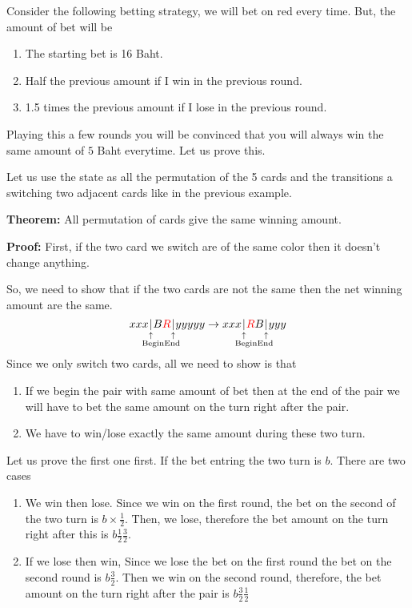 \documentclass[a4paper, 12pt]{article}
\newcommand{\half}{\frac{1}{2}}
\newcommand{\theorem}{\vspace{1em}\noindent\textbf{Theorem:} }
\renewcommand{\proof}{\vspace{0.5em}\noindent\textbf{Proof:} }
\newcommand{\expl}[2]{%
	\underset{\substack{\uparrow\\\mathrlap{\text{\hspace{-1em}#2}}}}{#1}}
\newcommand{\R}{\textcolor{red}{R}}
\theoremstyle{examplestyle}
\begin{document}
\begin{multicols}{2}
Consider the following betting strategy, we will bet on red every time. But, the amount of bet will be
\begin{enumerate}
	\item The starting bet is 16 Baht.
	\item Half the previous amount if I win in the previous round.
	\item 1.5 times the previous amount if I lose in the previous round.
\end{enumerate}

Playing this a few rounds you will be convinced that you will always win the same amount of $5$ Baht everytime. Let us prove this.

Let us use the state as all the permutation of the 5 cards and the transitions a switching two adjacent cards like in the previous example.

\theorem All permutation of cards give the same winning amount.

\proof First, if the two card we switch are of the same color then it doesn't change anything.

So, we need to show that if the two cards are not the same then the net winning amount are the same.
\[
xxx\expl{|}{Begin}B\R\expl{|}{End}yyyyy \to xxx\expl{|}{Begin}\R B\expl{|}{End}yyy
\]
Since we only switch two cards, all we need to show is that
\begin{enumerate}
	\item If we begin the pair with same amount of bet then at the end of the pair we will have to bet the same amount on the turn right after the pair.
	\item We have to win/lose exactly the same amount during these two turn.
\end{enumerate}

Let us prove the first one first. If the bet entring the two turn is $b$. There are two cases
\begin{enumerate}
	\item We win then lose. Since we win on the first round, the bet on the second of the two turn is $b\times \half$. Then, we lose, therefore the bet amount on the turn right after this is $b \half \frac{3}{2}$.
	\item If we lose then win, Since we lose the bet on the first round the bet on the second round is $b \frac{3}{2}$. Then we win on the second round, therefore, the bet amount on the turn right after the pair is $b \frac{3}{2}\half$
\end{enumerate}


\end{multicols}
\end{document}
